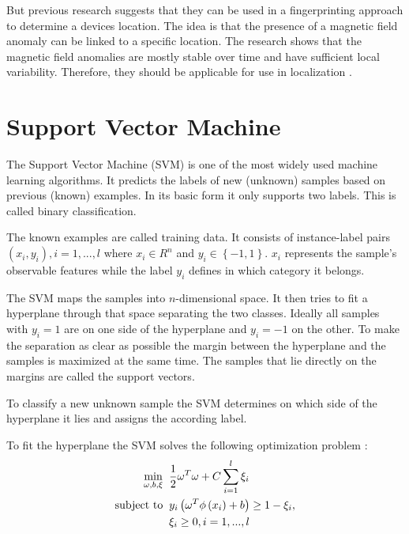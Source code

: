 But previous research suggests that they can be used in a fingerprinting approach to determine a devices location. The idea is that the presence of a magnetic field anomaly can be linked to a specific location. The research shows that the magnetic field anomalies are mostly stable over time and have sufficient local variability. Therefore, they should be applicable for use in localization \cite{haverinen2009global,angermann2012CharacterizationMagnetic,Li2012feasableMagnetic}.

\section{Support Vector Machine}
\label{theory:SVM}
The Support Vector Machine (SVM) is one of the most widely used machine learning algorithms. It predicts the labels of new (unknown) samples based on previous (known) examples. In its basic form it only supports two labels. This is called binary classification.

The known examples are called training data. It consists of instance-label pairs \(\left ( x_{i}, y_{i} \right ), i=1,...,l\) where \(x_{i}\in R^{n}\) and \(y_{i}\in \left \{ -1,1 \right \}\). \(x_{i}\) represents the sample's observable features while the label \(y_{i}\) defines in which category it belongs.

The SVM maps the samples into \(n\)-dimensional space. It then tries to fit a hyperplane through that space separating the two classes. Ideally all samples with \(y_{i}=1\) are on one side of the hyperplane and \(y_{i}=-1\) on the other. To make the separation as clear as possible the margin between the hyperplane and the samples is maximized at the same time. The samples that lie directly on the margins are called the support vectors.

To classify a new unknown sample the SVM determines on which side of the hyperplane it lies and assigns the according label.

To fit the hyperplane the SVM solves the following optimization problem \cite{chang2011libsvm}:
\begin{equation}
\begin{split}
\min_{\omega , b ,\xi}\;\; & \frac{1}{2}\omega^{T}\omega +C\sum_{i=1}^{l}\xi_{i}\\
\textup{subject to}\;\; & y_{i}\left ( \omega^{T}\phi \left ( x_{i} \right )+b \right )\geq 1-\xi_{i},\\
& \xi_{i}\geq 0,i=1,...,l
\end{split}
\end{equation}

